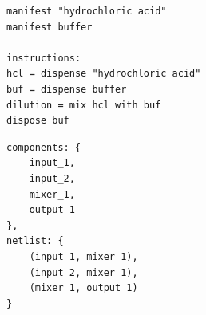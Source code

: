 \begin{figure}[tb]
\centering
    \begin{subfigure}{0.35\textwidth}
        \begin{lstlisting}
manifest "hydrochloric acid"
manifest buffer

instructions:
hcl = dispense "hydrochloric acid"
buf = dispense buffer
dilution = mix hcl with buf
dispose buf
        \end{lstlisting}
        \caption[short]{}
        \label{fig:bs_program}
    \end{subfigure}
    \begin{subfigure}{0.35\textwidth}
        \begin{lstlisting}
components: {
    input_1,
    input_2,
    mixer_1,
    output_1
},
netlist: {
    (input_1, mixer_1),
    (input_2, mixer_1),
    (mixer_1, output_1)
}
        \end{lstlisting}
        \caption[short]{}
        \label{fig:net_list}
    \end{subfigure}
    

\end{figure}
